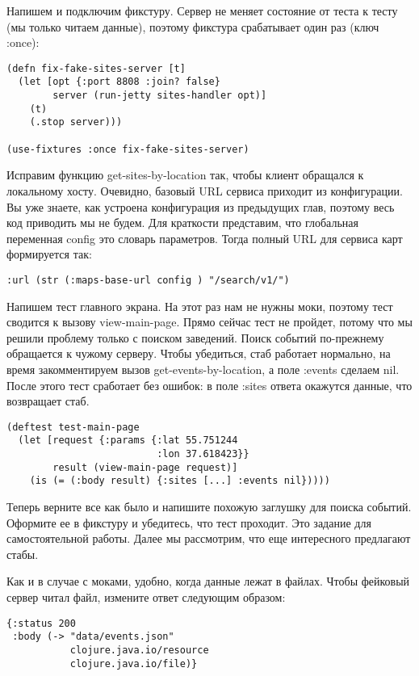Напишем и подключим фикстуру. Сервер не меняет состояние от теста к тесту (мы
только читаем данные), поэтому фикстура срабатывает один раз (ключ :once):

\begin{verbatim}
(defn fix-fake-sites-server [t]
  (let [opt {:port 8808 :join? false}
        server (run-jetty sites-handler opt)]
    (t)
    (.stop server)))

(use-fixtures :once fix-fake-sites-server)
\end{verbatim}

Исправим функцию get-sites-by-location так, чтобы клиент обращался к локальному
хосту. Очевидно, базовый URL сервиса приходит из конфигурации. Вы уже знаете,
как устроена конфигурация из предыдущих глав, поэтому весь код приводить мы не
будем. Для краткости представим, что глобальная переменная config это словарь
параметров. Тогда полный URL для сервиса карт формируется так:

\begin{verbatim}
:url (str (:maps-base-url config ) "/search/v1/")
\end{verbatim}

Напишем тест главного экрана. На этот раз нам не нужны моки, поэтому тест
сводится к вызову view-main-page. Прямо сейчас тест не пройдет, потому что мы
решили проблему только с поиском заведений. Поиск событий по-прежнему обращается
к чужому серверу. Чтобы убедиться, стаб работает нормально, на время
закомментируем вызов get-events-by-location, а поле :events сделаем nil. После
этого тест сработает без ошибок: в поле :sites ответа окажутся данные, что
возвращает стаб.

\begin{verbatim}
(deftest test-main-page
  (let [request {:params {:lat 55.751244
                          :lon 37.618423}}
        result (view-main-page request)]
    (is (= (:body result) {:sites [...] :events nil}))))
\end{verbatim}

Теперь верните все как было и напишите похожую заглушку для поиска
событий. Оформите ее в фикстуру и убедитесь, что тест проходит. Это задание для
самостоятельной работы. Далее мы рассмотрим, что еще интересного предлагают
стабы.

Как и в случае с моками, удобно, когда данные лежат в файлах. Чтобы фейковый
сервер читал файл, измените ответ следующим образом:

\begin{verbatim}
{:status 200
 :body (-> "data/events.json"
           clojure.java.io/resource
           clojure.java.io/file)}
\end{verbatim}

